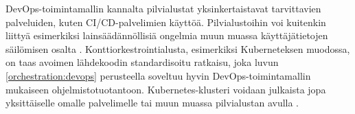 DevOps-toimintamallin kannalta pilvialustat yksinkertaistavat tarvittavien palveluiden, kuten CI/CD-palvelimien käyttöä.
Pilvialustoihin voi kuitenkin liittyä esimerkiksi lainsäädännöllisiä ongelmia muun muassa käyttäjätietojen säilömisen osalta \cite{Barati22}.
Konttiorkestrointialusta, esimerkiksi Kuberneteksen muodossa, on taas avoimen lähdekoodin standardisoitu ratkaisu, joka luvun \ref{orchestration:devops} perusteella soveltuu hyvin DevOps-toimintamallin mukaiseen ohjelmistotuotantoon.
Kubernetes-klusteri voidaan julkaista jopa yksittäiselle omalle palvelimelle tai muun muassa pilvialustan avulla \cite{Muddinagiri19, Khan22}.
